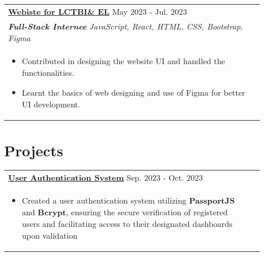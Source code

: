\documentclass[a4paper,8pt]{article}
\begin{document}
\begin{tabularx}{\linewidth}{ @{}l r@{} }
\color[HTML]{1C033C} \textbf{\uline{Webiste for LCTBI\& EL}} \hfill \color[HTML]{1C033C} May 2023 - Jul. 2023 \\[4pt]
\color[HTML]{1C033C}\textbf{\textit{Full-Stack Internee}} \hfill \color[HTML]{4B28A4} \textit{JavaScript, React, HTML, CSS, Bootstrap, Figma} \\[5pt]
\begin{minipage}[t]{\linewidth}
    \begin{itemize}[nosep,after=\strut, leftmargin=2em, itemsep=2pt]
       \color[HTML]{1C033C} \item Contributed in designing the website UI and handled the functionalities.
       \color[HTML]{1C033C} \item Learnt the basics of web designing and use of Figma for better UI development.
    \end{itemize}
    \end{minipage}\end{tabularx}

\color[HTML]{318CE7}\section{\textbf{Projects}}
\begin{tabularx}{\linewidth}{ @{}l r@{} }
\color[HTML]{1C033C} \textbf{\uline{\href{https://github.com/thisIsSrijan/User-Authentication}{User Authentication System}}} \hfill \color[HTML]{1C033C} Sep. 2023 - Oct. 2023 \\[4pt]
\begin{minipage}[t]{\linewidth}
    \begin{itemize}[nosep,after=\strut, leftmargin=2em, itemsep=2pt]
        \color[HTML]{1C033C}\item Created a user authentication system utilizing \textbf{PassportJS} and \textbf{Bcrypt}, ensuring the secure verification of registered users and facilitating access to their designated dashboards upon validation
    \end{itemize}
    \end{minipage}\end{tabularx}
\end{document}
